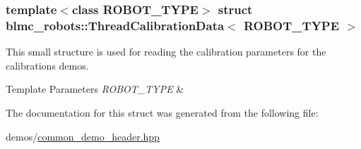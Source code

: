\subsubsection*{template$<$class R\+O\+B\+O\+T\+\_\+\+T\+Y\+PE$>$\newline
struct blmc\+\_\+robots\+::\+Thread\+Calibration\+Data$<$ R\+O\+B\+O\+T\+\_\+\+T\+Y\+P\+E $>$}

This small structure is used for reading the calibration parameters for the calibrations demos. 


\begin{DoxyTemplParams}{Template Parameters}
{\em R\+O\+B\+O\+T\+\_\+\+T\+Y\+PE} & \\
\hline
\end{DoxyTemplParams}


The documentation for this struct was generated from the following file\+:\begin{DoxyCompactItemize}
\item 
demos/\hyperlink{common__demo__header_8hpp}{common\+\_\+demo\+\_\+header.\+hpp}\end{DoxyCompactItemize}
